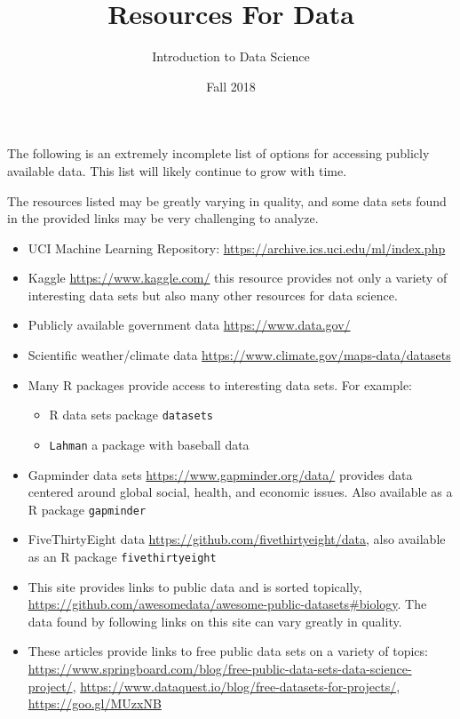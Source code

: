 \documentclass[12pt]{article}
\title{Resources For Data}
\author{Introduction to Data Science}
\date{Fall 2018}
\begin{document}
\maketitle

\noindent The following is an extremely incomplete list of options for accessing publicly available data. This list will likely continue to grow with time. 

 The resources listed may be greatly varying in quality, and some data sets found in the provided links may be very challenging to analyze. 

\begin{itemize}
    \item UCI Machine Learning Repository: \url{https://archive.ics.uci.edu/ml/index.php}
    \item Kaggle \url{https://www.kaggle.com/} this resource provides not only a variety of interesting data sets but also many other resources for data science. 
    \item Publicly available government data \url{https://www.data.gov/}
    \item Scientific weather/climate data \url{https://www.climate.gov/maps-data/datasets}
    \item Many R packages provide access to interesting data sets. For example:
    \begin{itemize}
        \item R data sets package {\tt datasets}
        \item {\tt Lahman} a package with baseball data
    \end{itemize}
     \item Gapminder data sets \url{https://www.gapminder.org/data/} provides data centered around global social, health, and economic issues. Also available as a R package {\tt gapminder}
    \item FiveThirtyEight data \url{https://github.com/fivethirtyeight/data}, also available as an R package {\tt fivethirtyeight}
    \item This site provides links to public data and is sorted topically, \url{https://github.com/awesomedata/awesome-public-datasets\#biology}. The data found by following links on this site can vary greatly in quality. 
    \item These articles provide links to free public data sets on a variety of topics: \url{https://www.springboard.com/blog/free-public-data-sets-data-science-project/}, \url{https://www.dataquest.io/blog/free-datasets-for-projects/}, \url{https://goo.gl/MUzxNB}
\end{itemize}
\end{document}
